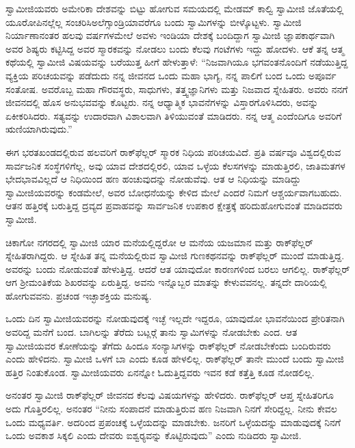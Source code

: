  ಸ್ವಾಮೀಜಿಯವರು ಅಮೇರಿಕಾ ದೇಶವನ್ನು ಬಿಟ್ಟು ಹೋಗುವ ಸಮಯದಲ್ಲಿ ಮೇಡಮ್ ಕಾಲ್ವಿ ಸ್ವಾಮೀಜಿ ಜೊತೆಯಲ್ಲಿ ಯೂರೋಪಿನಲ್ಲೆಲ್ಲ ಸಂಚರಿಸಿ\break ಅಲೆಗ್ಸಾಂಡ್ರಿಯಾವರೆಗೂ ಬಂದು ಸ್ವಾಮಿಗಳನ್ನು ಬೀಳ್ಕೊಟ್ಟಳು. ಸ್ವಾಮೀಜಿ ನಿರ್ಯಾಣಾನಂತರ ಹಲವು ವರ್ಷಗಳಮೇಲೆ ಅವಳು ಇಂಡಿಯಾ ದೇಶಕ್ಕೆ ಬಂದಿದ್ದಾಗ ಸ್ವಾಮೀಜಿ ಜ್ಞಾಪಕಾರ್ಥವಾಗಿ ಅವರ ಶಿಷ್ಯರು ಕಟ್ಟಿಸಿದ್ದ ಅವರ ಸ್ಮಾರಕವನ್ನು ನೋಡಲು ಬಂದು ಕೆಲವು ಗಂಟೆಗಳು ಇದ್ದು ಹೋದಳು. ಆಕೆ ತನ್ನ ಆತ್ಮ ಕಥೆಯಲ್ಲಿ ಸ್ವಾಮೀಜಿ ವಿಷಯವನ್ನು ಬರೆಯುತ್ತ ಹೀಗೆ ಹೇಳುತ್ತಾಳೆ: “ನಿಜವಾಗಿಯೂ ಭಗವಂತನೊಂದಿಗೆ ನಡೆಯುತ್ತಿದ್ದ ವ್ಯಕ್ತಿಯ ಪರಿಚಯವನ್ನು ಪಡೆದುದು ನನ್ನ ಜೀವನದ ಒಂದು ಮಹಾ ಭಾಗ್ಯ, ನನ್ನ ಪಾಲಿಗೆ ಬಂದ ಒಂದು ಅಪೂರ್ವ ಸಂತೋಷ. ಅವರೊಬ್ಬ ಮಹಾ ಗೌರವಸ್ಥರು, ಸಾಧುಗಳು, ತತ್ತ್ವಜ್ಞಾನಿಗಳು ಮತ್ತು ನಿಜವಾದ ಸ್ನೇಹಿತರು. ಅವರು ನನಗೆ ಜೀವನದಲ್ಲಿ ಹೊಸ ಅನುಭವವನ್ನು ಕೊಟ್ಟರು. ನನ್ನ ಆಧ್ಯಾತ್ಮಿಕ ಭಾವನೆಗಳನ್ನು ವಿಸ್ತಾರಗೊಳಿಸಿದರು, ಅವನ್ನು ಏಕೀಕರಿಸಿದರು. ಸತ್ಯವನ್ನು ಉದಾರವಾಗಿ ವಿಶಾಲವಾಗಿ ತಿಳಿಯುವಂತೆ ಮಾಡಿದರು. ನನ್ನ ಆತ್ಮ ಎಂದೆಂದಿಗೂ ಅವರಿಗೆ ಋಣಿಯಾಗಿರುವುದು.” 

 ಈಗ ಭರತಖಂಡದಲ್ಲಿರುವ ಹಲವರಿಗೆ ರಾಕ್‍ಫೆಲ್ಲರ್ ಸ್ಮಾರಕ ನಿಧಿಯ ಪರಿಚಯವಿದೆ. ಪ್ರತಿ ವರ್ಷವೂ ವಿಶ್ವದಲ್ಲಿರುವ ಸಾರ್ವಜನಿಕ ಸಂಸ್ಥೆಗಳಿಗೆಲ್ಲ, ಅವು ಯಾವ ದೇಶದಲ್ಲಿರಲಿ, ಯಾವ ಒಳ್ಳೆಯ ಕೆಲಸಗಳನ್ನು ಮಾಡುತ್ತಿರಲಿ, ಜಾತಿಮತಗಳ ಭೇದಭಾವವಿಲ್ಲದೆ ಆ ನಿಧಿಯಿಂದ ಹಣ ಹಂಚುವುದನ್ನು ನೋಡುವೆವು. ಆತ ಆ ನಿಧಿಯನ್ನು ಮಾಡಿದ್ದು ಸ್ವಾಮೀಜಿಯವರನ್ನು ಕಂಡಮೇಲೆ, ಅವರ ಬೋಧನೆಯನ್ನು ಕೇಳಿದ ಮೇಲೆ ಎಂದರೆ ನಿಮಗೆ ಆಶ್ಚರ್ಯವಾಗಬಹುದು. ಆತನ ಹತ್ತಿರಕ್ಕೆ ಬರುತ್ತಿದ್ದ ದ್ರವ್ಯದ ಪ್ರವಾಹವನ್ನು ಸಾರ್ವಜನಿಕ ಉಪಕಾರ ಕ್ಷೇತ್ರಕ್ಕೆ ಹರಿದುಹೋಗುವಂತೆ ಮಾಡಿದವರು ಸ್ವಾಮೀಜಿ. 

 ಚಿಕಾಗೋ ನಗರದಲ್ಲಿ ಸ್ವಾಮೀಜಿ ಯಾರ ಮನೆಯಲ್ಲಿದ್ದರೋ ಆ ಮನೆಯ ಯಜಮಾನ ಮತ್ತು ರಾಕ್‍ಫೆಲ್ಲರ್ ಸ್ನೇಹಿತರಾಗಿದ್ದರು. ಆ ಸ್ನೇಹಿತ ತನ್ನ ಮನೆಯಲ್ಲಿರುವ ಸ್ವಾಮೀಜಿ ಗುಣಕಥನವನ್ನು ರಾಕ್‍ಫೆಲ್ಲರ್ ಮುಂದೆ ಮಾಡುತ್ತಿದ್ದ. ಅವರನ್ನು ಬಂದು ನೋಡುವಂತೆ ಹೇಳುತ್ತಿದ್ದ. ಆದರೆ ಆತ ಯಾವುದೋ ಕಾರಣಗಳಿಂದ ಬರಲು ಆಗಲಿಲ್ಲ. ರಾಕ್‍ಫೆಲ್ಲರ್ ಆಗ ಶ‍್ರೀಮಂತಿಕೆಯ ಶಿಖರವನ್ನು ಏರುತ್ತಿದ್ದ. ಅವನು ಇನ್ನೊಬ್ಬರ ಮಾತನ್ನು ಕೇಳುವವನಲ್ಲ. ತನ್ನದೇ ದಾರಿಯಲ್ಲಿ ಹೋಗುವವನು. ಪ್ರಚಂಡ ಇಚ್ಛಾಶಕ್ತಿಯ ಮನುಷ್ಯ. 

 ಒಂದು ದಿನ ಸ್ವಾಮೀಜಿಯವರನ್ನು ನೋಡುವುದಕ್ಕೆ ಇಚ್ಛೆ ಇಲ್ಲದೇ ಇದ್ದರೂ, ಯಾವುದೋ ಭಾವನೆಯಿಂದ ಪ್ರೇರಿತನಾಗಿ ಅವರಿದ್ದ ಮನೆಗೆ ಬಂದ. ಬಾಗಿಲನ್ನು ತೆರೆದು ಬಟ್ಲರ್‍ಗೆ ತಾನು ಸ್ವಾಮಿಗಳನ್ನು ನೋಡಬೇಕು ಎಂದ. ಆತ ಸ್ವಾಮೀಜಿಯವರ ಕೋಣೆಯನ್ನು ತೆಗೆದು ಹಿಂದೂ ಸಂನ್ಯಾಸಿಗಳನ್ನು ರಾಕ್‍ಫೆಲ್ಲರ್ ನೋಡಬೇಕೆಂದು ಬಂದಿರುವರು ಎಂದು ಹೇಳಿದನು. ಸ್ವಾಮೀಜಿ ಒಳಗೆ ಬಾ ಎಂದು ಕೂಡ ಹೇಳಲಿಲ್ಲ. ರಾಕ್‍ಫೆಲ್ಲರ್ ತಾನೇ ಮುಂದೆ ಬಂದು ಸ್ವಾಮೀಜಿ ಹತ್ತಿರ ನಿಂತುಕೊಂಡ. ಸ್ವಾಮೀಜಿಯವರು ಏನನ್ನೋ ಓದುತ್ತಿದ್ದವರು ಇವನ ಕಡೆ ಕತ್ತೆತ್ತಿ ಕೂಡ ನೋಡಲಿಲ್ಲ. 

 ಅನಂತರ ಸ್ವಾಮೀಜಿ ರಾಕ್‍ಫೆಲ್ಲರ್ ಜೀವನದ ಕೆಲವು ವಿಷಯಗಳನ್ನು ಹೇಳಿದರು. ರಾಕ್‍ಫೆಲ್ಲರ್ ಆಪ್ತ ಸ್ನೇಹಿತರಿಗೂ ಅದು ಗೊತ್ತಿರಲಿಲ್ಲ. ಅನಂತರ “ನೀನು ಸಂಪಾದನೆ ಮಾಡುತ್ತಿರುವ ಹಣ ನಿಜವಾಗಿ ನಿನಗೆ ಸೇರಿದ್ದಲ್ಲ. ನೀನು ಕೇವಲ ಒಂದು ಮಧ್ಯವರ್ತಿ. ಅದರಿಂದ ಪ್ರಪಂಚಕ್ಕೆ ಒಳ್ಳೆಯದನ್ನು ಮಾಡಬೇಕು. ಜನರಿಗೆ ಒಳ್ಳೆಯದನ್ನು ಮಾಡುವುದಕ್ಕೆ ನಿನಗೆ ಒಂದು ಅವಕಾಶ ಸಿಕ್ಕಲಿ ಎಂದು ದೇವರು ಐಶ್ವರ‍್ಯವನ್ನು ಕೊಟ್ಟಿರುವುದು” ಎಂದು ನುಡಿದರು ಸ್ವಾಮೀಜಿ. 


